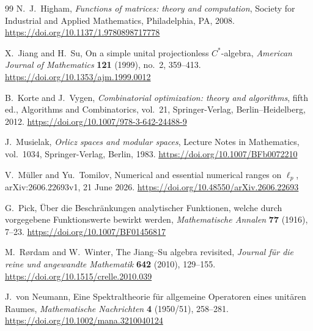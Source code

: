 \documentclass[a4paper]{amsart}
\theoremstyle{remark}
\begin{document}
\begin{thebibliography}{99}
N.~J.~Higham,
\emph{Functions of matrices: theory and computation},
Society for Industrial and Applied Mathematics, Philadelphia, PA, 2008.
\url{https://doi.org/10.1137/1.9780898717778}


X.~Jiang and H.~Su,
On a simple unital projectionless \(C^*\)-algebra,
\emph{American Journal of Mathematics} \textbf{121} (1999), no.~2, 359--413.
\url{https://doi.org/10.1353/ajm.1999.0012}

B.~Korte and J.~Vygen,
\emph{Combinatorial optimization: theory and algorithms}, fifth ed.,
Algorithms and Combinatorics, vol.~21,
Springer-Verlag, Berlin--Heidelberg, 2012.
\url{https://doi.org/10.1007/978-3-642-24488-9}

J.~Musielak,
\emph{Orlicz spaces and modular spaces},
Lecture Notes in Mathematics, vol.~1034, Springer-Verlag, Berlin, 1983.
\url{https://doi.org/10.1007/BFb0072210}

V.~M{\"u}ller and Yu.~Tomilov,
Numerical and essential numerical ranges on $\ell_p$,
arXiv:2606.22693v1, 21 June 2026.
\url{https://doi.org/10.48550/arXiv.2606.22693}

G.~Pick,
\"Uber die Beschr\"ankungen analytischer Funktionen, welche durch vorgegebene Funktionswerte bewirkt werden,
\emph{Mathematische Annalen} \textbf{77} (1916), 7--23.
\url{https://doi.org/10.1007/BF01456817}

M.~R{\o}rdam and W.~Winter,
The Jiang--Su algebra revisited,
\emph{Journal f\"ur die reine und angewandte Mathematik} \textbf{642} (2010), 129--155.
\url{https://doi.org/10.1515/crelle.2010.039}

J.~von Neumann,
Eine Spektraltheorie f\"ur allgemeine Operatoren eines unit\"aren Raumes,
\emph{Mathematische Nachrichten} \textbf{4} (1950/51), 258--281.
\url{https://doi.org/10.1002/mana.3210040124}

\end{thebibliography}
\end{document}
